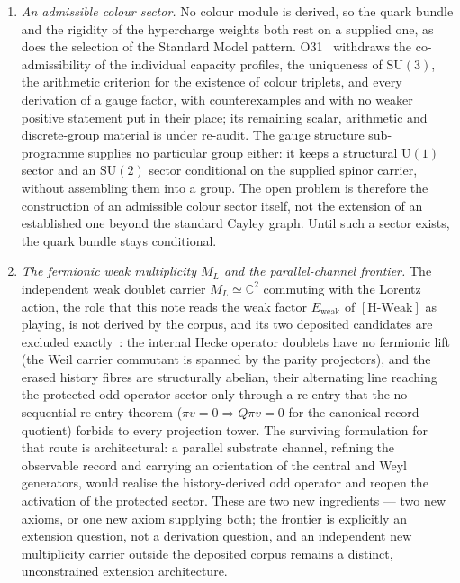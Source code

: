 \documentclass[11pt,a4paper]{article}
\theoremstyle{definition}
\newcommand{\SU}{\mathrm{SU}}
\newcommand{\UU}{\mathrm{U}}
\newcommand{\Ew}{E_{\mathrm{weak}}}
\newcommand{\HWeak}{\ensuremath{[\mathrm{H\text{-}Weak}]}}
\begin{document}
\begin{enumerate}
        \item \textit{An admissible colour sector.}
        No colour module is derived, so the quark bundle and the rigidity of the hypercharge weights
        both rest on a supplied one, as does the selection of the Standard Model pattern.
        O31~\cite{Beau2026a35} withdraws the co-admissibility of the individual capacity profiles,
        the uniqueness of $\SU(3)$, the arithmetic criterion for the existence of colour triplets,
        and every derivation of a gauge factor, with counterexamples and with no weaker positive
        statement put in their place; its remaining scalar, arithmetic and discrete-group material
        is under re-audit.
        The gauge structure sub-programme supplies no particular group either: it keeps a structural
        $\UU(1)$ sector and an $\SU(2)$ sector conditional on the supplied spinor carrier, without
        assembling them into a group.
        The open problem is therefore the construction of an admissible colour sector itself, not
        the extension of an established one beyond the standard Cayley graph.
        Until such a sector exists, the quark bundle stays conditional.

        \item \textit{The fermionic weak multiplicity $M_L$ and the parallel-channel frontier.}
        The independent weak doublet carrier $M_L \simeq \mathbb{C}^2$ commuting with the
        Lorentz action, the role that this note reads the weak factor $\Ew$ of \HWeak{} as playing, is not derived by
        the corpus, and its two deposited candidates are excluded exactly~\cite{Beau2026nsr}: the internal Hecke
        operator doublets have no fermionic lift (the Weil carrier commutant is spanned by the parity projectors), and
        the erased history fibres are structurally abelian, their alternating line reaching the
        protected odd operator sector only through a re-entry that the no-sequential-re-entry
        theorem ($\pi v=0 \Rightarrow Q\pi v=0$ for the canonical record quotient) forbids to
        every projection tower.
        The surviving formulation for that route is architectural: a parallel substrate channel,
        refining the observable record and carrying an orientation of the central and Weyl
        generators, would realise the history-derived odd operator and reopen the activation of
        the protected sector.
        These are two new ingredients --- two new axioms, or one new axiom supplying both; the
        frontier is explicitly an extension question, not a derivation question, and an
        independent new multiplicity carrier outside the deposited corpus remains a distinct,
        unconstrained extension architecture.


\end{enumerate}
\end{document}

